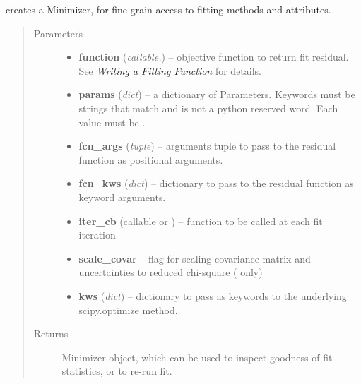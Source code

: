 \documentclass[letterpaper,10pt,english]{sphinxmanual}
\begin{document}
\begin{fulllineitems}
\label{fitting:Minimizer}
creates a Minimizer, for fine-grain access to fitting methods and attributes.
\begin{quote}\begin{description}
\item[{Parameters}] \leavevmode\begin{itemize}
\item {} 
\textbf{function} (\emph{callable.}) -- objective function to return fit residual.  See {\hyperref[fitting:fit-func-label]{\emph{Writing a Fitting Function}}} for details.

\item {} 
\textbf{params} (\emph{dict}) -- a dictionary of Parameters.  Keywords must be strings
that match \code{{[}a-z\_{]}{[}a-z0-9\_{]}*} and is not a python
reserved word.  Each value must be {\hyperref[parameters:Parameter]{}}.

\item {} 
\textbf{fcn\_args} (\emph{tuple}) -- arguments tuple to pass to the residual function as  positional arguments.

\item {} 
\textbf{fcn\_kws} (\emph{dict}) -- dictionary to pass to the residual function as keyword arguments.

\item {} 
\textbf{iter\_cb} (callable or ) -- function to be called at each fit iteration

\item {} 
\textbf{scale\_covar} -- flag for scaling covariance matrix and uncertainties to reduced chi-square ( only)

\item {} 
\textbf{kws} (\emph{dict}) -- dictionary to pass as keywords to the underlying scipy.optimize method.

\end{itemize}

\item[{Returns}] \leavevmode
Minimizer object, which can be used to inspect goodness-of-fit
statistics, or to re-run fit.

\end{description}\end{quote}

\end{fulllineitems}
\end{document}
